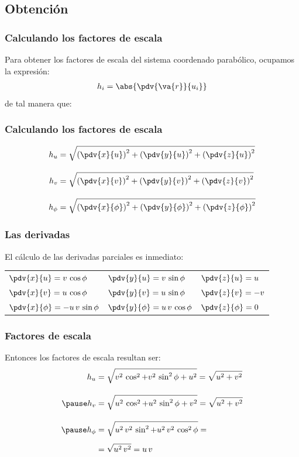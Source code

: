 \subsection{Obtención}
\begin{frame}
\frametitle{Calculando los factores de escala}
Para obtener los factores de escala del sistema coordenado parabólico, ocupamos la expresión:
\begin{align*}
h_{i} = \abs{\pdv{\va{r}}{u_{i}}}
\end{align*}
de tal manera que:
\end{frame}
\begin{frame}
\frametitle{Calculando los factores de escala}
\begin{align*}
h_{u} &= \sqrt{\left(\pdv{x}{u}\right)^{2} + \left(\pdv{y}{u}\right)^{2} + \left(\pdv{z}{u}\right)^{2}} \\[1em]
h_{v} &= \sqrt{\left(\pdv{x}{v}\right)^{2} + \left(\pdv{y}{v}\right)^{2} + \left(\pdv{z}{v}\right)^{2}} \\[1em]
h_{\phi} &= \sqrt{\left(\pdv{x}{\phi}\right)^{2} + \left(\pdv{y}{\phi}\right)^{2} + \left(\pdv{z}{\phi}\right)^{2}}
\end{align*}
\end{frame}
\begin{frame}
\frametitle{Las derivadas}
El cálculo de las derivadas parciales es inmediato:
\begin{table}
\centering
\fontsize{12}{12}\selectfont
\begin{tabular}{l l l}
$\displaystyle \pdv{x}{u} = v \, \cos \phi$ & $\displaystyle \pdv{y}{u} = v \, \sin \phi$ & $\displaystyle \pdv{z}{u} = u$ \\[0.5em]
$\displaystyle \pdv{x}{v} = u \, \cos \phi$ & $\displaystyle \pdv{y}{v} = u \, \sin \phi$ & $\displaystyle \pdv{z}{v} = - v$ \\[0.5em]
$\displaystyle \pdv{x}{\phi} = - u \, v \, \sin \phi$ & $\displaystyle \pdv{y}{\phi} = u \, v \, \cos \phi$ & $\displaystyle \pdv{z}{\phi} = 0$
\end{tabular}
\end{table}
\end{frame}
\begin{frame}
\frametitle{Factores de escala}
Entonces los factores de escala resultan ser:
\begin{eqnarray}
\begin{aligned}
h_{u} &=\sqrt{ v^{2} \, \cos^{2} + v^{2} \, \sin^{2} \phi + u^{2} } = \sqrt{u^{2} + v^{2}} \\[1em] \pause
h_{v} &=\sqrt{ u^{2} \, \cos^{2} + u^{2} \, \sin^{2} \phi + v^{2} } = \sqrt{u^{2} + v^{2}} \\[1em] \pause
h_{\phi} &=\sqrt{ u^{2} \, v^{2} \, \sin^{2} + u^{2} \, v^{2} \, \cos^{2} \phi} = \\[0.5em]
&= \sqrt{u^{2} \, v^{2}} = u \, v
\end{aligned}
\label{eq:ecuacion_05}
\end{eqnarray}
\end{frame}
